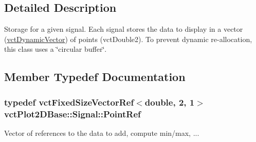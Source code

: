 \subsection{Detailed Description}
Storage for a given signal. Each signal stores the data to display in a vector (\hyperlink{classvct_dynamic_vector}{vct\-Dynamic\-Vector}) of points (vct\-Double2). To prevent dynamic re-\/allocation, this class uses a \char`\"{}circular
buffer\char`\"{}. 

\subsection{Member Typedef Documentation}
\hypertarget{classvct_plot2_d_base_1_1_signal_a81b636c91281333319b7f806b8432b92}{
\subsubsection[{Point\-Ref}]{\setlength{\rightskip}{0pt plus 5cm}typedef {\bf vct\-Fixed\-Size\-Vector\-Ref}$<$double, 2, 1$>$ {\bf vct\-Plot2\-D\-Base\-::\-Signal\-::\-Point\-Ref}\hspace{0.3cm}{\ttfamily [protected]}}}\label{classvct_plot2_d_base_1_1_signal_a81b636c91281333319b7f806b8432b92}
Vector of references to the data to add, compute min/max, ... 

